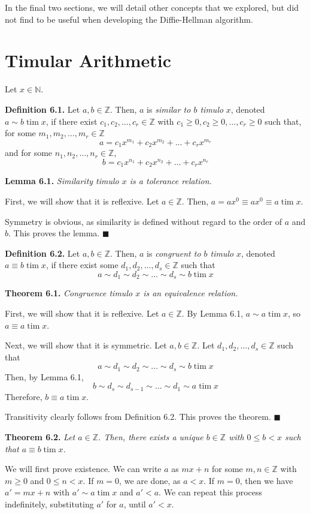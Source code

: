 \documentclass{article}
\newcommand{\tim}{\;\text{tim}\;}
\newcommand{\zee}{\mathbb{Z}}
\newcommand{\N}{\mathbb{N}}
\begin{document}
In the final two sections, we will detail other concepts that we
explored, but did not find to be useful when developing the Diffie-Hellman
algorithm.

\section{Timular Arithmetic}

Let $x \in \N$.

\textbf{Definition 6.1.} Let $a, b \in \zee$.
Then, $a$ is \textit{similar to $b$ timulo} $x$,
denoted $a \sim b \tim x$,
if there exist $c_1, c_2, \ldots, c_r \in \zee$
with $c_1 \geq 0, c_2 \geq 0, \ldots, c_r \geq 0$
such that, for some $m_1, m_2, \ldots, m_r \in \zee$
\[a = c_1x^{m_1} + c_2x^{m_2} + \ldots + c_rx^{m_r}\]
and for some $n_1, n_2, \ldots, n_r \in \zee$,
\[b = c_1x^{n_1} + c_2x^{n_2} + \ldots + c_rx^{n_r}\]


\textbf{Lemma 6.1.} \textit{Similarity timulo $x$ is a
tolerance relation.}

First, we will show that it is reflexive. Let $a \in \zee$.
Then, $a = ax^0 \equiv ax^0 \equiv a \tim x$.

Symmetry is obvious, as similarity is defined without
regard to the order of $a$ and $b$. This proves the lemma.
$\blacksquare$


\textbf{Definition 6.2.} Let $a, b \in \zee$.
Then, $a$ is \textit{congruent to $b$ timulo} $x$, denoted
$a \equiv b \tim x$, if there exist some $d_1, d_2, \ldots, d_s \in \zee$
such that
\[a \sim d_1 \sim d_2 \sim \ldots \sim d_s \sim b \tim x\]

\textbf{Theorem 6.1.} \textit{Congruence timulo $x$ is an
equivalence relation.}

First, we will show that it is reflexive. Let $a \in \zee$.
By Lemma 6.1, $a \sim a \tim x$, so $a \equiv a \tim x$.

Next, we will show that it is symmetric. Let $a, b \in \zee$.
Let $d_1, d_2, \ldots, d_s \in \zee$ such that
\[a \sim d_1 \sim d_2 \sim \ldots \sim d_s \sim b \tim x\]
Then, by Lemma 6.1,
\[b \sim d_s \sim d_{s-1} \sim \ldots \sim d_1 \sim a \tim x\]
Therefore, $b \equiv a \tim x$.

Transitivity clearly follows from Definition 6.2. This proves the
theorem. $\blacksquare$

\textbf{Theorem 6.2.} \textit{Let $a \in \zee$.
Then, there exists a unique
$b \in \zee$ with $0 \leq b < x$
such that $a \equiv b \tim x$.}

We will first prove existence.
We can write $a$ as $mx + n$ for some
$m, n \in \zee$ with $m \geq 0$ and $0 \leq n < x$.
If $m = 0$, we are done, as $a < x$.
If $m = 0$, then we have $a' = mx + n$
with $a' \sim a \tim x$ and $a' < a$.
We can repeat this process indefinitely,
substituting $a'$ for $a$,
until $a' < x$.
\end{document}
